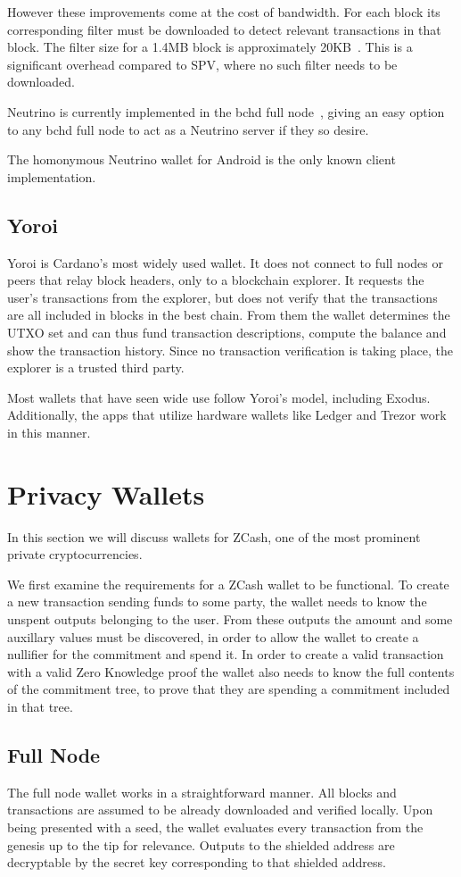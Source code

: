 \documentclass[sigconf]{acmart}
\begin{document}
However these improvements come at the cost of bandwidth. For each block its corresponding filter must be downloaded to detect relevant transactions in that block. The filter size for a 1.4MB block is approximately 20KB~\cite{jimmysong}. This is a significant overhead compared to SPV, where no such filter needs to be downloaded.

Neutrino is currently implemented in the bchd full node~\cite{bchd}, giving an easy option to any bchd full node to act as a Neutrino server if they so desire.

The homonymous Neutrino wallet for Android is the only known client implementation.

\subsection{Yoroi}
Yoroi is Cardano's most widely used wallet. It does not connect to full nodes or peers that relay block headers, only to a blockchain explorer. It requests the user's transactions from the explorer, but does not verify that the transactions are all included in blocks in the best chain. From them the wallet determines the UTXO set and can thus fund transaction descriptions, compute the balance and show the transaction history. Since no transaction verification is taking place, the explorer is a trusted third party.

Most wallets that have seen wide use follow Yoroi's model, including Exodus. Additionally, the apps that utilize hardware wallets like Ledger and Trezor work in this manner.

\section{Privacy Wallets}
In this section we will discuss wallets for ZCash, one of the most prominent private cryptocurrencies.

We first examine the requirements for a ZCash wallet to be functional. To create a new transaction sending funds to some party, the wallet needs to know the unspent outputs belonging to the user. From these outputs the amount and some auxillary values must be discovered, in order to allow the wallet to create a nullifier for the commitment and spend it. In order to create a valid transaction with a valid Zero Knowledge proof the wallet also needs to know the full contents of the commitment tree, to prove that they are spending a commitment included in that tree.

\subsection{Full Node}
The full node wallet works in a straightforward manner. All blocks and transactions are assumed to be already downloaded and verified locally. Upon being presented with a seed, the wallet evaluates every transaction from the genesis up to the tip for relevance. Outputs to the shielded address are decryptable by the secret key corresponding to that shielded address.
\end{document}
